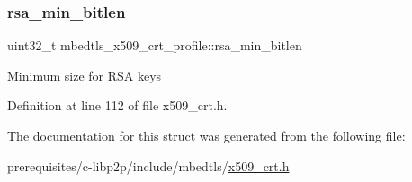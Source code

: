 \subsubsection{\texorpdfstring{rsa\+\_\+min\+\_\+bitlen}{rsa\_min\_bitlen}}
{\footnotesize\ttfamily uint32\+\_\+t mbedtls\+\_\+x509\+\_\+crt\+\_\+profile\+::rsa\+\_\+min\+\_\+bitlen}

Minimum size for R\+SA keys 

Definition at line 112 of file x509\+\_\+crt.\+h.



The documentation for this struct was generated from the following file\+:\begin{DoxyCompactItemize}
\item 
prerequisites/c-\/libp2p/include/mbedtls/\mbox{\hyperlink{x509__crt_8h}{x509\+\_\+crt.\+h}}\end{DoxyCompactItemize}
